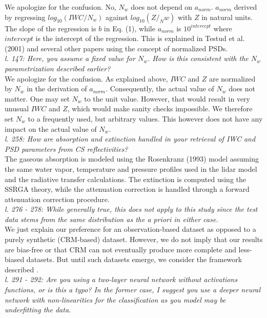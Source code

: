 \documentclass[12pt]{article}
\begin{document}
\noindent We apologize for the confusion. No, $N_w$ does not depend on $a_{norm}$. $a_{norm}$ derived by regressing $log_{10}(IWC/N_w)$ against $log_{10}(Z/_Nw)$ with $Z$ in natural units. The slope of the regression is $b$ in Eq. (1), while $a_{norm}$ is $10^{intercept}$ where $intercept$ is the intercept of the regression.  This is explained in Testud et al. (2001) and several other papers using the concept of normalized PSDs. \\

\noindent\textit{l. 147: Here, you assume a fixed value for $N_w$. How is this consistent with the $N_w$ parametrization described earlier?}\\

\noindent We apologize for the confusion. As explained above, $IWC$ and $Z$ are normalized by $N_w$ in the derivation of $a_{norm}$. Consequently, the actual value of $N_w$ does not matter. One may set $N_w$ to the unit value. However, that would result in very unusual $IWC$ and $Z$, which would make sanity checks impossible.  We therefore set $N_w$ to a frequently used, but arbitrary values. This however does not have any impact on the actual value of $N_w$.\\

\noindent\textit{l. 258: How are absorption and extinction handled in your retrieval of IWC and PSD parameters from CS reflectivities?}\\

The gaseous absorption is modeled using the Rosenkranz (1993) model assuming the same water vapor, temperature and pressure profiles used in the lidar model and the radiative transfer calculations. The extinction is computed using the SSRGA theory, while the attenuation correction is handled through a forward attenuation correction procedure.
\\
\noindent\textit{l. 276 - 278: While generally true, this does not apply to this study since the test data stems from the same distribution as the a priori in either case.}\\

\noindent We just explain our preference for an observation-based dataset as opposed to a purely synthetic (CRM-based) dataset. However, we do not imply that our results are bias-free or that CRM can not eventually produce more complete and less-biased datasets. But until such datasets emerge, we consider the framework described .\\

\noindent\textit{l. 291 - 292: Are you using a two-layer neural network without activations functions, or is this a typo? In the former case, I suggest you use a deeper neural network with non-linearities for the classification as you model may be underfitting the data.}\\
\end{document}
